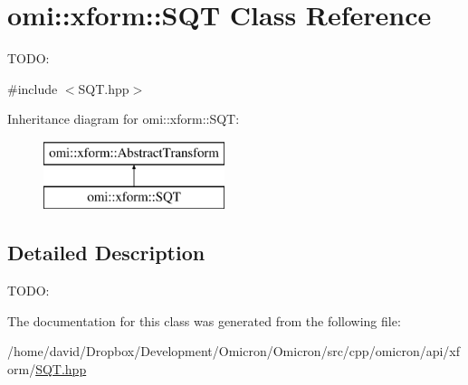 \hypertarget{classomi_1_1xform_1_1_s_q_t}{}\section{omi\+:\+:xform\+:\+:S\+QT Class Reference}
\label{classomi_1_1xform_1_1_s_q_t}


T\+O\+DO\+:  




{\ttfamily \#include $<$S\+Q\+T.\+hpp$>$}

Inheritance diagram for omi\+:\+:xform\+:\+:S\+QT\+:\begin{figure}[H]
\begin{center}
\leavevmode
\includegraphics[height=2.000000cm]{classomi_1_1xform_1_1_s_q_t}
\end{center}
\end{figure}


\subsection{Detailed Description}
T\+O\+DO\+: 

The documentation for this class was generated from the following file\+:\begin{DoxyCompactItemize}
\item 
/home/david/\+Dropbox/\+Development/\+Omicron/\+Omicron/src/cpp/omicron/api/xform/\hyperlink{_s_q_t_8hpp}{S\+Q\+T.\+hpp}\end{DoxyCompactItemize}
